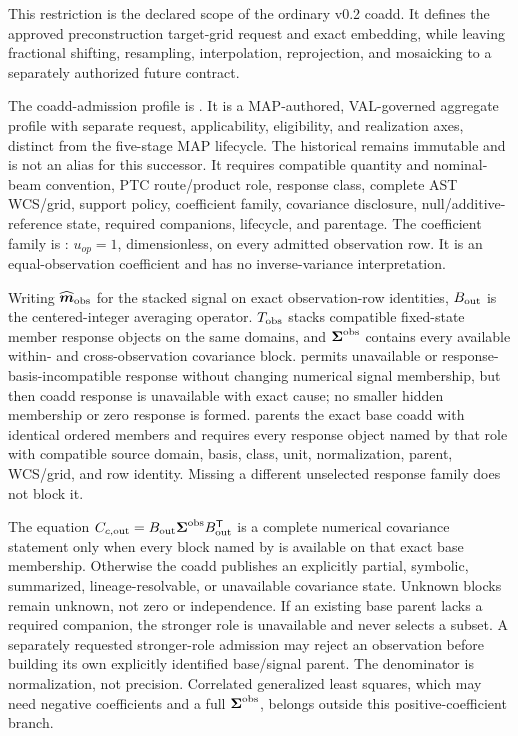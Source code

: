 \documentclass[10pt]{article}
\begin{document}
This restriction is the declared scope of the ordinary v0.2 coadd. It defines
the approved preconstruction target-grid request and exact embedding, while
leaving fractional shifting, resampling, interpolation, reprojection, and
mosaicking to a separately authorized future contract.

The coadd-admission profile is
\SCIMapCoaddProfile. It is a MAP-authored,
VAL-governed aggregate profile with separate request, applicability,
eligibility, and realization axes, distinct from the five-stage MAP lifecycle.
The historical \SCIMapCoaddProfileHistorical{} remains immutable and is not an
alias for this successor. It requires compatible quantity
and nominal-beam convention, PTC route/product role, response class, complete
AST WCS/grid, support policy, coefficient family, covariance disclosure,
null/additive-reference state, required companions, lifecycle, and parentage.
The coefficient family is
\SCIMapUniformCoaddProfile: \(u_{op}=1\),
dimensionless, on every admitted observation row. It is an equal-observation
coefficient and has no inverse-variance interpretation.

Writing \(\widehat{\boldsymbol m}_{\rm obs}\) for the stacked signal on exact
observation-row identities, \(B_{\rm out}\) is the centered-integer averaging
operator. \(T_{\rm obs}\) stacks compatible fixed-state member response objects on the
same domains, and \(\boldsymbol\Sigma^{\rm obs}\) contains every available
within- and cross-observation covariance block. \SCIMapBaseCoaddRole{} permits
unavailable or response-basis-incompatible response without changing numerical
signal membership, but then coadd response is unavailable with exact cause;
no smaller hidden membership or zero response is formed.
\SCIMapResponseCoaddRole{} parents the exact base coadd with identical ordered
members and requires every response object named by that role with compatible
source domain, basis, class, unit, normalization, parent, WCS/grid, and row
identity. Missing a different unselected response family does not block it.

The equation
\(C_{c,{\rm out}}=B_{\rm out}\boldsymbol\Sigma^{\rm obs}B_{\rm out}^{\mathsf T}\)
is a complete numerical covariance statement only when every block named by
\SCIMapCovarianceCoaddRole{} is available on that exact base membership. Otherwise the coadd
publishes an explicitly partial, symbolic, summarized, lineage-resolvable, or
unavailable covariance state. Unknown blocks remain unknown, not zero or
independence. If an existing base parent lacks a required companion, the
stronger role is unavailable and never selects a subset. A separately
requested stronger-role admission may reject an observation before building
its own explicitly identified base/signal parent. The denominator is normalization,
not precision. Correlated generalized least squares, which may
need negative coefficients and a full \(\boldsymbol\Sigma^{\rm obs}\), belongs
outside this positive-coefficient branch.
\end{document}
